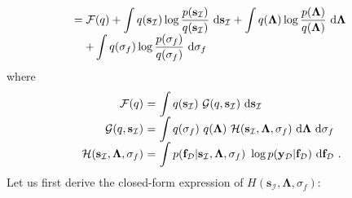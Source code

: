 \documentclass[conference]{IEEEtran}
\begin{document}
\begin{equation*}
\begin{array}{l}
			\displaystyle= \mathcal{F}(q)+\int q(\mathbf{s}_\mathcal{I})\log\dfrac{p(\mathbf{s}_\mathcal{I})}{q(\mathbf{s}_\mathcal{I})}\ \mathrm{d}\mathbf{s}_\mathcal{I}+
			\int q(\mathbf{\Lambda})\log\dfrac{p(\mathbf{\Lambda})}{q(\mathbf{\Lambda})}\ \mathrm{d}\mathbf{\Lambda}\ \vspace{-0mm}\\
			\displaystyle\quad+\int q(\sigma_f)\log\dfrac{p(\sigma_f)}{q(\sigma_f)}\ \mathrm{d}\sigma_f
		\end{array}
	\end{equation*}
	where
	\begin{equation*}
		\begin{array}{rcl}
	\mathcal{F}(q)&\hspace{-2.4mm}=&\hspace{-2.4mm}\displaystyle\int q(\mathbf{s}_\mathcal{I})\ \mathcal{G}(q,\mathbf{s}_\mathcal{I})\ \mathrm{d}\mathbf{s}_\mathcal{I}\\
	\mathcal{G}(q, \mathbf{s}_\mathcal{I})&\hspace{-2.4mm}=&\hspace{-2.4mm}\displaystyle\int q(\sigma_f)\ q(\mathbf{\Lambda})\ \mathcal{H}(\mathbf{s}_\mathcal{I},\mathbf{\Lambda},\sigma_f)\ \mathrm{d}\mathbf{\Lambda}\ \mathrm{d}\sigma_f \\
	\mathcal{H}(\mathbf{s}_\mathcal{I},\mathbf{\Lambda},\sigma_f)&\hspace{-2.4mm}=&\hspace{-2.4mm}\displaystyle\int p(\mathbf{f}_\mathcal{D}|\mathbf{s}_\mathcal{I},\mathbf{\Lambda},\sigma_f)\ \log p(\mathbf{y}_\mathcal{D}|\mathbf{f}_\mathcal{D})\ \mathrm{d}\mathbf{f}_\mathcal{D}\ .
		\end{array}
	\end{equation*}
	Let us first derive the closed-form expression of $H(\mathbf{s}_\mathcal{I},\mathbf{\Lambda},\sigma_f)$:
\end{document}

